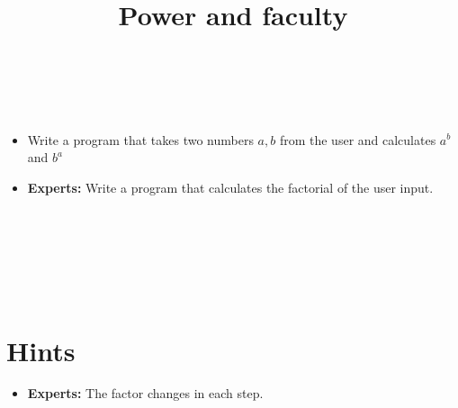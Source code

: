 


\title{Power and faculty} %
\author{} %
\renewcommand{\difficulty}{Medium} %
\renewcommand{\requirements}{Variables, input/output, loops} %
\renewcommand{\aims}{Calculating with loops} %


 \maketitle
 \taskinfos

\ \\\ \\
\begin{itemize}
	\item Write a program that takes two numbers $a, b$ from the user and calculates $a^b$ and $b^a$
	\item \textbf{Experts:} Write a program that calculates the factorial of the user input.
\end{itemize}	
 
 
\ \\\ \\\ \\\ \\\ \\
\section*{Hints}
	\begin{itemize}
		\item \textbf{Experts:} The factor changes in each step.
	\end{itemize}
 

